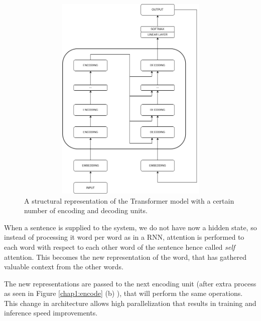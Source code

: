 \documentclass[11pt,english,listoffigures,listoftables]{tfgetsinf}
\begin{document}
\begin{figure}
\centering
\includegraphics[width=12cm,keepaspectratio,height=10cm]{resources/transformer.png}
\caption{A structural representation of the Transformer model with a certain number of encoding and decoding units.}\label{chap1:transformer}
\end{figure}

When a sentence is supplied to the system, we do not have now a hidden state, so instead of processing it word per word as in a RNN, attention is performed to each word with respect to each other word of the sentence hence called \textit{self} attention. This becomes the new representation of the word, that has gathered valuable context from the other words. 

The new representations are passed to the next encoding unit (after extra process as seen in Figure \ref{chap1:encode} (b) ), that will perform the same operations.
This change in architecture allows high parallelization that results in training and inference speed improvements.
\end{document}

